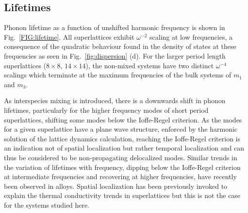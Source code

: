\documentclass[aps,prb,preprint,preprintnumbers,amsmath,amssymb,floatfix,superscriptaddress]{revtex4}
\begin{document}


\subsection{Lifetimes}

Phonon lifetime as a function of unshifted harmonic frequency is shown in Fig.~\ref{FIG:lifetime}. All superlattices exhibit $\omega^{-2}$ scaling at low frequencies, a consequence of the quadratic behaviour found in the density of states at these frequencies as seen in Fig.~\ref{fig:dispersion} (d).\cite{Klemens_Thermal_1951} For the larger period length superlattices ($8\times8$, $14\times14$), the non-mixed systems have two distinct $\omega^{-4}$ scalings which terminate at the maximum frequencies of the bulk systems of $m_1$ and $m_3$.

As interspecies mixing is introduced, there is a downwards shift in phonon lifetimes, particularly for the higher frequency modes of short period superlattices, shifting some modes below the Ioffe-Regel criterion. As the modes for a given superlattice have a plane wave structure, enforced by the harmonic solution of the lattice dynamics calculation, reaching the Ioffe-Regel criterion is an indication not of spatial localization but rather temporal localization and can thus be considered to be non-propagating delocalized modes.\cite{allen_thermal_1993} Similar trends in the variation of lifetimes with frequency, dipping below the Ioffe-Regel criterion at intermediate frequencies and recovering at higher frequencies, have recently been observed in alloys.\cite{jason2013vc} Spatial localization has been previously invoked to explain the thermal conductivity trends in superlattices \cite{PhysRevB.61.3091} but this is not the case for the systems studied here.
\end{document}

